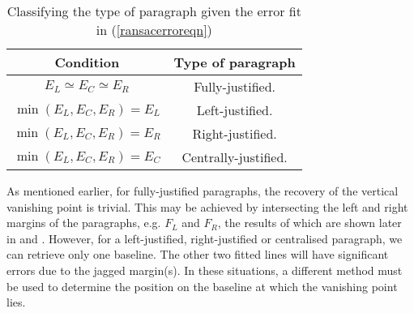 \begin{table}[t]
  \begin{center}
    \begin{tabular}{|c|c|}
      \hline
      {\bf Condition} & {\bf Type of paragraph} \\
      \hline \hline
      $E_L \simeq E_C \simeq E_R$ & Fully-justified. \\
      \hline
      $\min(E_L,E_C,E_R)=E_L$ & Left-justified. \\
      \hline
      $\min(E_L,E_C,E_R)=E_R$ & Right-justified. \\
      \hline
      $\min(E_L,E_C,E_R)=E_C$ & Centrally-justified. \\
      \hline
    \end{tabular}
  \end{center}
  \caption{Classifying the type of paragraph given the error fit in (\ref{ransacerroreqn})}
  \label{typeofparatable}
\end{table}



As mentioned earlier, for fully-justified paragraphs, the recovery of the
vertical vanishing point is trivial. This may be achieved by intersecting the
left and right margins of the paragraphs, e.g. $F_L$ and $F_R$, the results of 
which are shown later in  and . 
However, for a left-justified, right-justified or centralised paragraph, we can
retrieve only one baseline.  The other two fitted lines will have significant
errors due to the jagged margin(s).  In these situations, a different method
must be used to determine the position on the baseline at which the vanishing
point lies.







